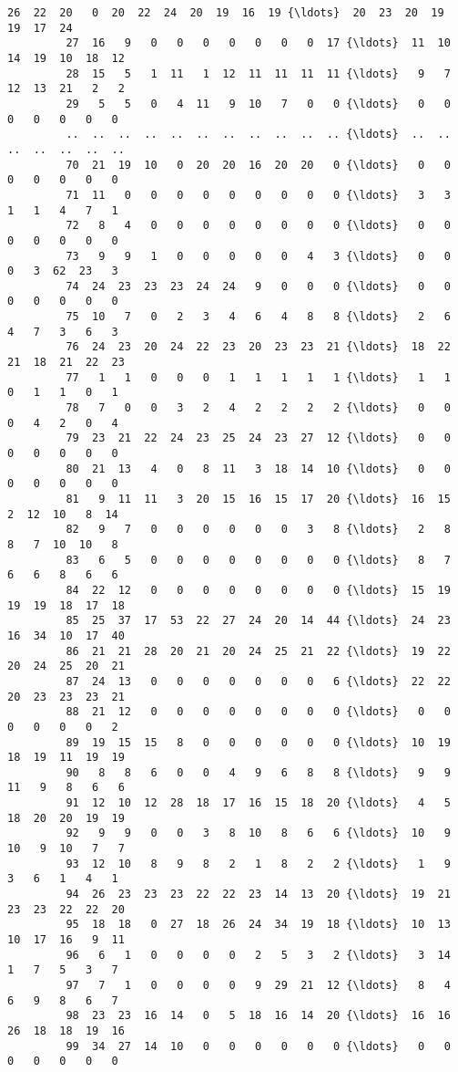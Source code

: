 \documentclass[11pt]{article}
\begin{document}
\begin{Verbatim}[commandchars=\\\{\}]
         26  22  20   0  20  22  24  20  19  16  19 {\ldots}  20  23  20  19  19  17  24   
         27  16   9   0   0   0   0   0   0   0  17 {\ldots}  11  10  14  19  10  18  12   
         28  15   5   1  11   1  12  11  11  11  11 {\ldots}   9   7  12  13  21   2   2   
         29   5   5   0   4  11   9  10   7   0   0 {\ldots}   0   0   0   0   0   0   0   
         ..  ..  ..  ..  ..  ..  ..  ..  ..  ..  .. {\ldots}  ..  ..  ..  ..  ..  ..  ..   
         70  21  19  10   0  20  20  16  20  20   0 {\ldots}   0   0   0   0   0   0   0   
         71  11   0   0   0   0   0   0   0   0   0 {\ldots}   3   3   1   1   4   7   1   
         72   8   4   0   0   0   0   0   0   0   0 {\ldots}   0   0   0   0   0   0   0   
         73   9   9   1   0   0   0   0   0   4   3 {\ldots}   0   0   0   3  62  23   3   
         74  24  23  23  23  24  24   9   0   0   0 {\ldots}   0   0   0   0   0   0   0   
         75  10   7   0   2   3   4   6   4   8   8 {\ldots}   2   6   4   7   3   6   3   
         76  24  23  20  24  22  23  20  23  23  21 {\ldots}  18  22  21  18  21  22  23   
         77   1   1   0   0   0   1   1   1   1   1 {\ldots}   1   1   0   1   1   0   1   
         78   7   0   0   3   2   4   2   2   2   2 {\ldots}   0   0   0   4   2   0   4   
         79  23  21  22  24  23  25  24  23  27  12 {\ldots}   0   0   0   0   0   0   0   
         80  21  13   4   0   8  11   3  18  14  10 {\ldots}   0   0   0   0   0   0   0   
         81   9  11  11   3  20  15  16  15  17  20 {\ldots}  16  15   2  12  10   8  14   
         82   9   7   0   0   0   0   0   0   3   8 {\ldots}   2   8   8   7  10  10   8   
         83   6   5   0   0   0   0   0   0   0   0 {\ldots}   8   7   6   6   8   6   6   
         84  22  12   0   0   0   0   0   0   0   0 {\ldots}  15  19  19  19  18  17  18   
         85  25  37  17  53  22  27  24  20  14  44 {\ldots}  24  23  16  34  10  17  40   
         86  21  21  28  20  21  20  24  25  21  22 {\ldots}  19  22  20  24  25  20  21   
         87  24  13   0   0   0   0   0   0   0   6 {\ldots}  22  22  20  23  23  23  21   
         88  21  12   0   0   0   0   0   0   0   0 {\ldots}   0   0   0   0   0   0   2   
         89  19  15  15   8   0   0   0   0   0   0 {\ldots}  10  19  18  19  11  19  19   
         90   8   8   6   0   0   4   9   6   8   8 {\ldots}   9   9  11   9   8   6   6   
         91  12  10  12  28  18  17  16  15  18  20 {\ldots}   4   5  18  20  20  19  19   
         92   9   9   0   0   3   8  10   8   6   6 {\ldots}  10   9  10   9  10   7   7   
         93  12  10   8   9   8   2   1   8   2   2 {\ldots}   1   9   3   6   1   4   1   
         94  26  23  23  23  22  22  23  14  13  20 {\ldots}  19  21  23  23  22  22  20   
         95  18  18   0  27  18  26  24  34  19  18 {\ldots}  10  13  10  17  16   9  11   
         96   6   1   0   0   0   0   2   5   3   2 {\ldots}   3  14   1   7   5   3   7   
         97   7   1   0   0   0   0   9  29  21  12 {\ldots}   8   4   6   9   8   6   7   
         98  23  23  16  14   0   5  18  16  14  20 {\ldots}  16  16  26  18  18  19  16   
         99  34  27  14  10   0   0   0   0   0   0 {\ldots}   0   0   0   0   0   0   0   
         

\end{Verbatim}
\end{document}

